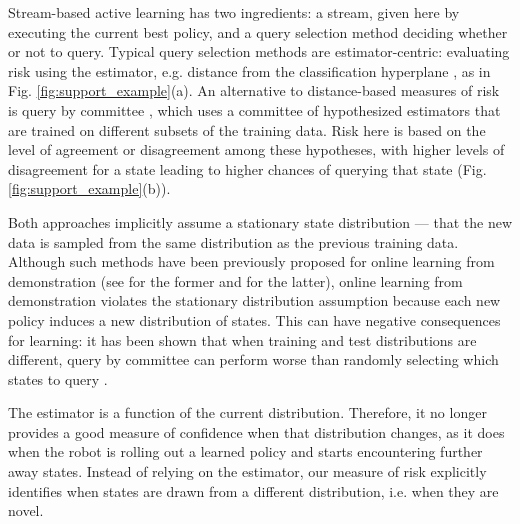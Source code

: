 \documentclass[10pt, conference]{ieeeconf}      %
\begin{document}
Stream-based active learning has two ingredients: a stream, given here by executing the current best policy, and a query selection method deciding whether or not to query. Typical query selection methods are estimator-centric:  evaluating risk using the estimator, e.g. distance from the classification hyperplane \cite{tong2002support}, as in Fig. \ref{fig:support_example}(a). An alternative to distance-based measures of  risk is query by committee  \cite{breiman1996bagging}, which uses a committee of hypothesized estimators that are trained on different subsets of the training data. Risk here is based on the level of agreement or disagreement among these hypotheses, with higher levels of disagreement for a state leading to higher chances of querying that state (Fig. \ref{fig:support_example}(b)).

Both approaches implicitly assume a stationary state distribution --- that the new data is sampled from the same distribution as the previous training data. Although such methods have been previously proposed for online learning from demonstration (see \cite{chernova2009interactive,grollman2007dogged} for the former and \cite{judah2011active,judah2012active} for the latter),
online learning from demonstration violates the stationary distribution assumption because each new policy induces a new distribution of states. This can have negative consequences for learning: it has been shown that when training and test distributions are different, query by committee can perform worse than randomly selecting  which states to query \cite{burbidge2007active}.

The  estimator is a function of the current distribution. Therefore, it no longer provides a good measure of confidence when that distribution changes, as it does when the robot is rolling out a learned policy and starts encountering further away states. Instead of relying on the estimator, our measure of risk explicitly identifies when states are drawn from a different distribution, i.e. when they are novel. 

\end{document}
